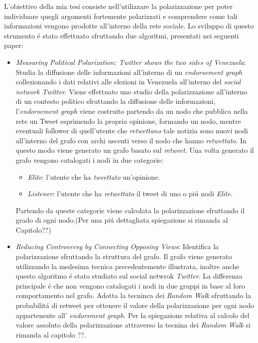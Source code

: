 L'obiettivo della mia tesi consiste nell'utilizzare la polarizzazione per poter individuare quegli argomenti fortemente polarizzati e comprendere come tali informazioni vengono prodotte all'interno della rete sociale.
Lo sviluppo di questo strumento \'e stato effettuato sfruttando due algoritmi, presentati nei seguenti paper:
\begin{itemize}
\item \textit{Measuring Political Polarization: Twitter shows the two sides of Venezuela}:
Studia la diffusione delle informazioni all'interno di un \textit{endorsement graph} collezionando i dati relativi alle elezioni in Venezuela all'interno del \textit{social network Twitter}. Viene effettuato uno studio della polarizzazione all'interno di un contesto politico sfruttando la diffusione delle informazioni, l'\textit{endorsement graph} viene costruito partendo da un nodo che pubblica nella rete un Tweet esprimendo la propria opinione, formando un nodo, mentre eventuali follower di quell'utente che \textit{retwettano} tale notizia sono nuovi nodi all'interno del grafo con archi uscenti verso il nodo che hanno \textit{retwettato}. In questo modo viene generato un grafo basato sul \textit{retweet}.
Una volta generato il grafo vengono catalogati i nodi in due categorie:
\begin{itemize}
\item \textit{Elite}: l'utente che ha \textit{tweettato} un'opinione.
\item \textit{Listener}: l'utente che ha \textit{retwettato} il tweet di uno o pi\'u nodi \textit{Elite}.
\end{itemize}
Partendo da queste categorie viene calcolata la polarizzazione sfruttando il grado di ogni nodo.(Per una pi\'u dettagliata spiegazione si rimanda al Capitolo??)

\item \textit{Reducing Controversy by Connecting Opposing Views}:
Identifica la polarizzazione sfruttando la struttura del grafo. Il grafo viene generato utilizzando la medesima tecnica precedentemente illustrata, inoltre anche questo algoritmo \'e stato studiato sul social netwrok \textit{Twitter}. La differenza principale \'e che non vengono catalogati i nodi in due gruppi in base al loro comportamento nel grafo. Adotta la tecninca dei \textit{Random Walk} sfruttando la probabilit\'a di retweet per ottenere il valore della polarizzazione per ogni nodo appartenente all' \textit{endorsment graph}. Per la spiegazione relativa al calcolo del valore assoluto della polarizzazione attraverso la tecnina dei \textit{Random Walk} si rimanda al capitolo ??.
\end{itemize}

